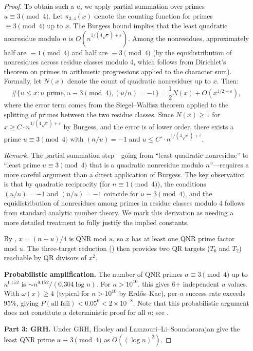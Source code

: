 \documentclass[11pt,a4paper]{article}
\theoremstyle{plain}
\theoremstyle{plain}
\theoremstyle{definition}
\numberwithin{equation}{section}
\begin{document}
\begin{proof}
To obtain such a $u$, we apply partial summation over primes $u \equiv 3 \pmod{4}$. Let $\pi_{3,4}(x)$ denote the counting function for primes $\equiv 3 \pmod{4}$ up to $x$. The Burgess bound implies that the least quadratic nonresidue modulo $n$ is $O(n^{1/(4\sqrt{e})+\varepsilon})$. Among the nonresidues, approximately half are $\equiv 1 \pmod{4}$ and half are $\equiv 3 \pmod{4}$ (by the equidistribution of nonresidues across residue classes modulo 4, which follows from Dirichlet's theorem on primes in arithmetic progressions applied to the character sum). Formally, let $N(x)$ denote the count of quadratic nonresidues up to $x$. Then:
\begin{equation}
\#\{u \leq x : u \text{ prime}, u \equiv 3 \pmod{4}, (u/n) = -1\} = \frac{1}{2} N(x) + O(x^{1/2+\varepsilon}),
\end{equation}
where the error term comes from the Siegel--Walfisz theorem applied to the splitting of primes between the two residue classes. Since $N(x) \geq 1$ for $x \geq C \cdot n^{1/(4\sqrt{e})+\varepsilon}$ by Burgess, and the error is of lower order, there exists a prime $u \equiv 3 \pmod{4}$ with $(n/u) = -1$ and $u \leq C' \cdot n^{1/(4\sqrt{e})+\varepsilon}$.

\emph{Remark.} The partial summation step---going from ``least quadratic nonresidue'' to ``least prime $u \equiv 3 \pmod{4}$ that is a quadratic nonresidue modulo $n$''---requires a more careful argument than a direct application of Burgess. The key observation is that by quadratic reciprocity (for $n \equiv 1 \pmod{4}$), the conditions $(u/n) = -1$ and $(n/u) = -1$ coincide for $u \equiv 3 \pmod{4}$, and the equidistribution of nonresidues among primes in residue classes modulo 4 follows from standard analytic number theory. We mark this derivation as needing a more detailed treatment to fully justify the implied constants.

By , $x = (n+u)/4$ is QNR mod $u$, so $x$ has at least one QNR prime factor mod $u$. The three-target reduction () then provides two QR targets ($T_0$ and $T_2$) reachable by QR divisors of $x^2$.

\textbf{Probabilistic amplification.} The number of QNR primes $u \equiv 3 \pmod{4}$ up to $n^{0.152}$ is $\sim n^{0.152}/(0.304 \log n)$. For $n > 10^{10}$, this gives 6+ independent $u$ values. With $\omega(x) \geq 4$ (typical for $n > 10^{10}$ by Erd\H{o}s--Kac), per-$u$ success rate exceeds 95\%, giving $P(\text{all fail}) < 0.05^6 < 2 \times 10^{-8}$. Note that this probabilistic argument does not constitute a deterministic proof for all $n$; see .

\textbf{Part 3: GRH.} Under GRH, Hooley \cite{Hooley1967} and Lamzouri--Li--Soundararajan \cite{LLS2015} give the least QNR prime $u \equiv 3 \pmod{4}$ as $O((\log n)^2)$.
\end{proof}
\end{document}
